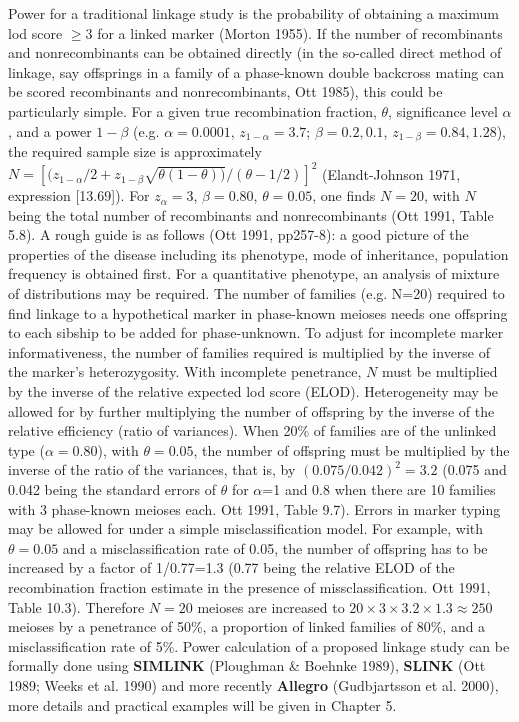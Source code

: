 Power for a traditional linkage study is the probability of obtaining a maximum
lod score $\geq 3$ for a linked marker (Morton 1955).  If the number of
recombinants and nonrecombinants can be obtained directly (in the so-called
direct method of linkage, say offsprings in a family of a phase-known double
backcross mating can be scored recombinants and nonrecombinants, Ott 1985),
this could be particularly simple.  For a given true recombination fraction,
$\theta$, significance level $\alpha$, and a power $1-\beta$ (e.g.
$\alpha=0.0001$, $z_{1-\alpha}=3.7$; $\beta=0.2, 0.1$, $z_{1-\beta}=0.84,
1.28$), the required sample size is approximately
$N=\left[{(z_{1-\alpha}/2+z_{1-\beta}\sqrt{\theta(1-\theta))}}/{(\theta-1/2)}
\right]^2$ (Elandt-Johnson 1971, expression [13.69]).  For $z_\alpha=3$,
$\beta=0.80$, $\theta=0.05$, one finds $N=20$, with $N$ being the total number
of recombinants and nonrecombinants (Ott 1991, Table 5.8).  A rough guide is as
follows (Ott 1991, pp257-8):  a good picture of the properties of the disease
including its phenotype, mode of inheritance, population frequency is obtained
first.  For a quantitative phenotype, an analysis of mixture of distributions
may be required.  The number of families (e.g.  N=20) required to find linkage
to a hypothetical marker in phase-known meioses needs one offspring to each
sibship to be added for phase-unknown.  To adjust for incomplete marker
informativeness, the number of families required is multiplied by the inverse
of the marker's heterozygosity.  With incomplete penetrance, $N$ must be
multiplied by the inverse of the relative expected lod score (ELOD).
Heterogeneity may be allowed for by further multiplying the number of offspring
by the inverse of the relative efficiency (ratio of variances).  When 20\% of
families are of the unlinked type ($\alpha=0.80$), with $\theta=0.05$, the
number of offspring must be multiplied by the inverse of the ratio of the
variances, that is, by $(0.075/0.042)^2=3.2$ (0.075 and 0.042 being the
standard errors of $\theta$ for $\alpha$=1 and 0.8 when there are 10 families
with 3 phase-known meioses each.  Ott 1991, Table 9.7).  Errors in marker
typing may be allowed for under a simple misclassification model.  For example,
with $\theta=0.05$ and a misclassification rate of 0.05, the number of
offspring has to be increased by a factor of 1/0.77=1.3 (0.77 being the
relative ELOD of the recombination fraction estimate in the presence of
missclassification.  Ott 1991, Table 10.3).  Therefore $N=20$ meioses are
increased to $20 \times 3 \times 3.2 \times 1.3 \approx 250$ meioses by a
penetrance of 50\%, a proportion of linked families of 80\%, and a
misclassification rate of 5\%.  Power calculation of a proposed linkage study
can be formally done using {\bf SIMLINK} (Ploughman \& Boehnke 1989), {\bf
SLINK} (Ott 1989; Weeks et al.  1990) and more recently {\bf Allegro}
(Gudbjartsson et al.  2000), more details and practical examples will be given
in Chapter 5.

